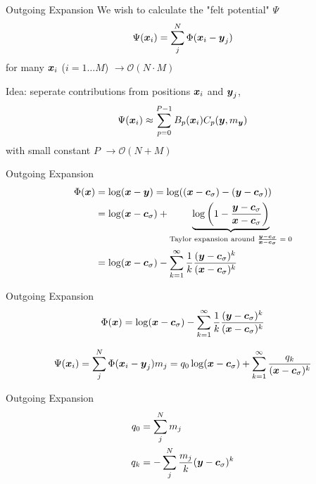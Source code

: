 \begin{frame}{Outgoing Expansion}
  We wish to calculate the "felt potential" $\Psi$
  \begin{equation}
    \Psi(\boldsymbol{x}_i) = \sum_j^N \Phi(\boldsymbol{x}_i - \boldsymbol{y}_j)
  \end{equation}
  for many $\boldsymbol{x}_i$ ($i = 1 \dots M$) $\rightarrow \mathcal{O}(N\cdot M)$

  Idea: seperate contributions from positions $\boldsymbol{x}_i$ and $\boldsymbol{y}_j$,
  \begin{equation}
    \Psi(\boldsymbol{x}_i) \approx \sum_{p=0}^{P-1} B_p(\boldsymbol{x}_i) C_p(\boldsymbol{y}, m_{\boldsymbol{y}})
  \end{equation}
  with small constant $P$ $\rightarrow \mathcal{O}(N+M)$
\end{frame}

\begin{frame}{Outgoing Expansion}
  \begin{align}
    \Phi(\vct x) &= \log(\vct x - \vct y)
    = \log((\vct x - \vct c_\sigma) - (\vct y - \vct c_\sigma)) \\
    &= \log(\vct x - \vct c_\sigma) + \underbrace{\log \left(1 - \frac{\vct y - \vct c_\sigma}{\vct x - \vct c_\sigma} \right)}%
      _\text{Taylor expansion around $\frac{\vct y - \vct c_\sigma}{\vct x - \vct c_\sigma} = 0$} \\
    &= \log(\vct x - \vct c_\sigma) - \sum_{k=1}^\infty \frac 1k \frac{(\vct y - \vct c_\sigma)^k}{(\vct x - \vct c_\sigma)^k}
  \end{align}
\end{frame}

\begin{frame}{Outgoing Expansion}
  \begin{equation}
    \Phi(\boldsymbol{x}) = \log(\boldsymbol{x} - \boldsymbol{c}_\sigma) - \sum_{k=1}^\infty \frac 1k \frac{(\boldsymbol{y} - \boldsymbol{c}_\sigma)^k}{(\boldsymbol{x} - \boldsymbol{c}_\sigma)^k}
  \end{equation}

  \begin{equation}
    \Psi(\boldsymbol{x}_i) = \sum_j^N \Phi(\boldsymbol{x}_i - \boldsymbol{y}_j) m_j
    = q_0 \log(\boldsymbol{x} - \boldsymbol{c}_\sigma) + \sum_{k=1}^\infty \frac{q_k}{(\boldsymbol{x} - \boldsymbol{c}_\sigma)^k}
  \end{equation}

  \begin{block}{Outgoing Expansion}
    \begin{equation}
      \begin{split}
        q_0 &= \sum_j^N m_j \\
        q_k &= - \sum_j^N \frac{m_j}{k} (\boldsymbol{y} - \boldsymbol{c}_\sigma)^k
      \end{split}
    \end{equation}
  \end{block}
\end{frame}


